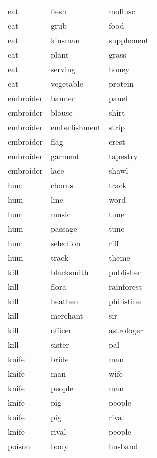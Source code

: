 \begin{longtable}{l|ll}
eat       & flesh          & mollusc      \\
eat       & grub           & food         \\
eat       & kinsman        & supplement   \\
eat       & plant          & grass        \\
eat       & serving        & honey        \\
eat       & vegetable      & protein      \\
embroider & banner         & panel        \\
embroider & blouse         & shirt        \\
embroider & embellishment  & strip        \\
embroider & flag           & crest        \\
embroider & garment        & tapestry     \\
embroider & lace           & shawl        \\
hum       & chorus         & track        \\
hum       & line           & word         \\
hum       & music          & tune         \\
hum       & passage        & tune         \\
hum       & selection      & riff         \\
hum       & track          & theme        \\
kill      & blacksmith     & publisher    \\
kill      & flora          & rainforest   \\
kill      & heathen        & philistine   \\
kill      & merchant       & sir          \\
kill      & officer        & astrologer   \\
kill      & sister         & pal          \\
knife     & bride          & man          \\
knife     & man            & wife         \\
knife     & people         & man          \\
knife     & pig            & people       \\
knife     & pig            & rival        \\
knife     & rival          & people       \\
poison    & body           & husband      \\

\end{longtable}
